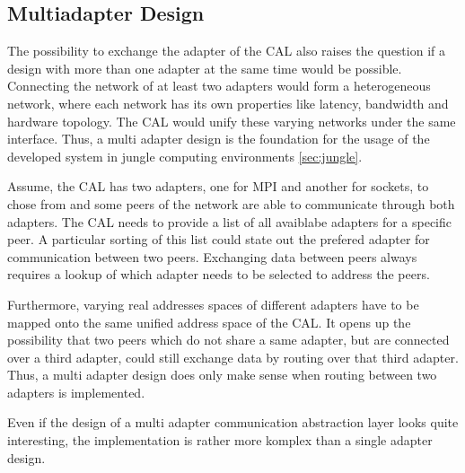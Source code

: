 \subsection{Multiadapter Design}

The possibility to exchange the adapter of the CAL also raises the
question if a design with more than one adapter at the same time would
be possible. Connecting the network of at least two adapters would
form a heterogeneous network, where each network has its own
properties like latency, bandwidth and hardware topology. The CAL
would unify these varying networks under the same interface. Thus, a
multi adapter design is the foundation for the usage of the developed
system in jungle computing environments
\ref{sec:jungle}.

Assume, the CAL has two adapters, one for MPI and another for sockets,
to chose from and some peers of the network are able to communicate
through both adapters.  The CAL needs to provide a list of all
avaiblabe adapters for a specific peer. A particular sorting of this
list could state out the prefered adapter for communication between
two peers. Exchanging data between peers always requires a lookup of
which adapter needs to be selected to address the peers.


Furthermore, varying real addresses spaces of different adapters have
to be mapped onto the same unified address space of the CAL.
It opens up the possibility that two peers which do not share a same
adapter, but are connected over a third adapter, could still exchange data
by routing over that third adapter. Thus, a multi adapter design
does only make sense when routing between two adapters is implemented.


Even if the design of a multi adapter communication abstraction layer
looks quite interesting, the implementation is rather more komplex
than a single adapter design. 

